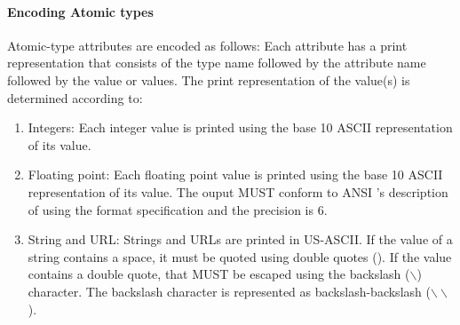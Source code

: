 \documentclass[justify]{nasa-ese}
\begin{document}



\paragraph{Encoding Atomic types} Atomic-type attributes are encoded as
follows: Each attribute has a print representation that consists of the type
name followed by the attribute name followed by the value or values. The
print representation of the value(s) is determined according to:

\begin{enumerate}
\item Integers: Each integer value is printed using the base 10 ASCII
  representation of its value.
\item Floating point: Each floating point value is printed using the base 10
  ASCII representation of its value. The ouput MUST conform to ANSI \C's
  description of  using the  format specification and
  the precision is 6.
\item String and URL: Strings and URLs are printed in US-ASCII. If the value
  of a string contains a space, it must be quoted using double quotes
  (). If the value contains a double quote, that MUST be escaped using
  the backslash ($\backslash$) character. The backslash character is
  represented as backslash-backslash ($\backslash\backslash$).
\end{enumerate}
\end{document}
